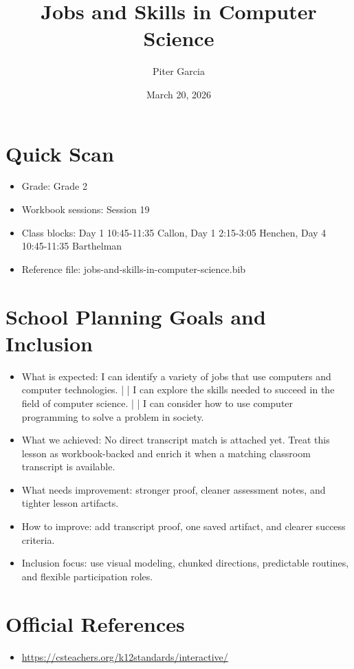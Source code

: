 \documentclass[11pt]{article}
\title{Jobs and Skills in Computer Science}
\author{Piter Garcia}
\date{March 20, 2026}
\begin{document}
\maketitle
\section*{Quick Scan}
\begin{itemize}[leftmargin=*]
\item Grade: Grade 2
\item Workbook sessions: Session 19
\item Class blocks: Day 1 10:45-11:35 Callon, Day 1 2:15-3:05 Henchen, Day 4 10:45-11:35 Barthelman
\item Reference file: jobs-and-skills-in-computer-science.bib
\end{itemize}
\section*{School Planning Goals and Inclusion}
\begin{itemize}[leftmargin=*]
\item What is expected: I can identify a variety of jobs that use computers and computer technologies. | | I can explore the skills needed to succeed in the field of computer science. | | I can consider how to use computer programming to solve a problem in society.
\item What we achieved: No direct transcript match is attached yet. Treat this lesson as workbook-backed and enrich it when a matching classroom transcript is available.
\item What needs improvement: stronger proof, cleaner assessment notes, and tighter lesson artifacts.
\item How to improve: add transcript proof, one saved artifact, and clearer success criteria.
\item Inclusion focus: use visual modeling, chunked directions, predictable routines, and flexible participation roles.
\end{itemize}
\section*{Official References}
\begin{itemize}[leftmargin=*]
\item \url{https://csteachers.org/k12standards/interactive/}

\end{itemize}
\end{document}
